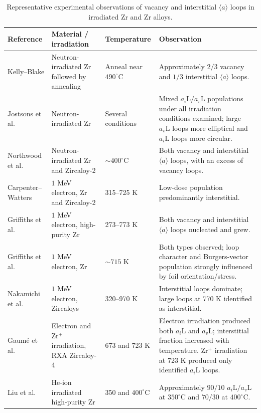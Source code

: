 \documentclass{article}
\newcommand{\aloop}{\ensuremath{\langle a\rangle}}
\newcommand{\aiL}{a_{i}\mathrm{L}}
\newcommand{\avL}{a_{v}\mathrm{L}}
\begin{document}
\begin{table}[htbp]
\centering
\small
\caption{Representative experimental observations of vacancy and interstitial
\aloop{} loops in irradiated Zr and Zr alloys.}
\label{tab:coexist-exp}
\begin{tabularx}{\textwidth}{@{}l >{\raggedright\arraybackslash}p{} l X@{}}
\toprule
\textbf{Reference}
&
\textbf{Material / irradiation}
&
\textbf{Temperature}
&
\textbf{Observation}
\\
\midrule
Kelly--Blake
\citep{kelly1973characterization}
&
Neutron-irradiated Zr followed by annealing
&
Anneal near $490^\circ$C
&
Approximately $2/3$ vacancy and $1/3$ interstitial \aloop{} loops.
\\[1mm]
Jostsons et al.\
\citep{jostsons1977nature}
&
Neutron-irradiated Zr
&
Several conditions
&
Mixed $\aiL/\avL$ populations under all irradiation conditions examined;
large $\avL$ loops more elliptical and $\aiL$ loops more circular.
\\[1mm]
Northwood et al.\
\citep{northwood1979characterization}
&
Neutron-irradiated Zr and Zircaloy-2
&
$\sim400^\circ$C
&
Both vacancy and interstitial \aloop{} loops, with an excess of vacancy loops.
\\[1mm]
Carpenter--Watters
\citep{carpenter1981study}
&
$1$ MeV electron, Zr and Zircaloy-2
&
315--725 K
&
Low-dose population predominantly interstitial.
\\[1mm]
Griffiths et al.\
\citep{griffiths1983electron1}
&
$1$ MeV electron, high-purity Zr
&
273--773 K
&
Both vacancy and interstitial \aloop{} loops nucleated and grew.
\\[1mm]
Griffiths et al.\
\citep{griffiths1984anisotropic}
&
$1$ MeV electron, Zr
&
$\sim715$ K
&
Both types observed; loop character and Burgers-vector population strongly
influenced by foil orientation/stress.
\\[1mm]
Nakamichi et al.\
\citep{nakamichi1997formation}
&
$1$ MeV electron, Zircaloys
&
320--970 K
&
Interstitial loops dominate; large loops at 770 K identified as interstitial.
\\[1mm]
Gaum\'e et al.\
\citep{gaume2017microstructure}
&
Electron and Zr$^+$ irradiation, RXA Zircaloy-4
&
673 and 723 K
&
Electron irradiation produced both $\aiL$ and $\avL$; interstitial fraction
increased with temperature. Zr$^+$ irradiation at 723 K produced only identified
$\aiL$ loops.
\\[1mm]
Liu et al.\
\citep{liu2020two}
&
He-ion irradiated high-purity Zr
&
350 and $400^\circ$C
&
Approximately $90/10$ $\aiL/\avL$ at $350^\circ$C and $70/30$ at $400^\circ$C.
\\
\bottomrule
\end{tabularx}
\end{table}
\end{document}

